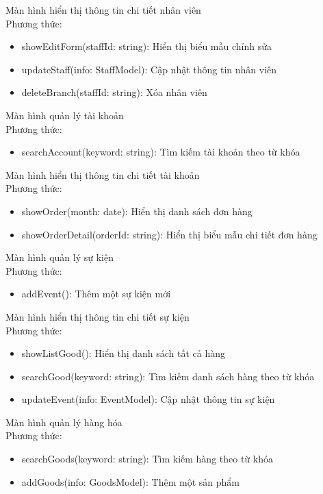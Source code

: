 Màn hình hiển thị thông tin chi tiết nhân viên\\
Phương thức:
\begin{itemize}
	\item showEditForm(staffId: string): Hiển thị biểu mẫu chỉnh sửa
	\item updateStaff(info: StaffModel): Cập nhật thông tin nhân viên
	\item deleteBranch(staffId: string): Xóa nhân viên
\end{itemize}

Màn hình quản lý tài khoản\\
Phương thức:
\begin{itemize}
	\item searchAccount(keyword: string): Tìm kiếm tài khoản theo từ khóa
\end{itemize}


Màn hình hiển thị thông tin chi tiết tài khoản\\
Phương thức:
\begin{itemize}
	\item showOrder(month: date): Hiển thị danh sách đơn hàng
	\item showOrderDetail(orderId: string): Hiển thị biểu mẫu chi tiết đơn hàng
\end{itemize}

Màn hình quản lý sự kiện\\
Phương thức:
\begin{itemize}
	\item addEvent(): Thêm một sự kiện mới
\end{itemize}

Màn hình hiển thị thông tin chi tiết sự kiện\\
Phương thức:
\begin{itemize}
	\item showListGood(): Hiển thị danh sách tất cả hàng
	\item searchGood(keyword: string): Tìm kiếm danh sách hàng theo từ khóa
	\item updateEvent(info: EventModel): Cập nhật thông tin sự kiện
\end{itemize}

Màn hình quản lý hàng hóa\\
Phương thức:
\begin{itemize}
	\item searchGoods(keyword: string): Tìm kiếm hàng theo từ khóa
	\item addGoods(info: GoodsModel): Thêm một sản phẩm
\end{itemize}

